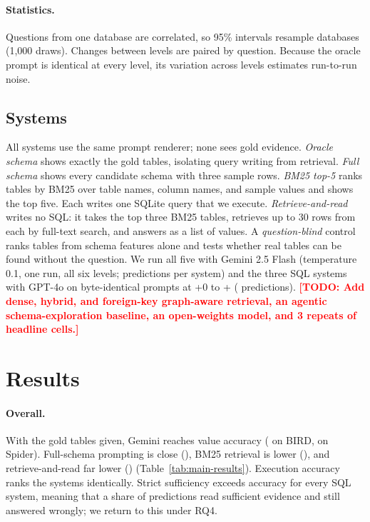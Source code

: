 \documentclass[11pt]{article}
\newif\ifdraft \drafttrue   %
\newcommand{\todo}[1]{\ifdraft\textcolor{red}{\textbf{[TODO: #1]}}\fi}
\begin{document}
\paragraph{Statistics.} Questions from one database are correlated, so 95\% intervals resample databases (1{,}000 draws). Changes between levels are paired by question. Because the oracle prompt is identical at every level, its variation across levels estimates run-to-run noise.

\subsection{Systems}\label{sec:systems}
All systems use the same prompt renderer; none sees gold evidence. \emph{Oracle schema} shows exactly the gold tables, isolating query writing from retrieval. \emph{Full schema} shows every candidate schema with three sample rows. \emph{BM25 top-5} ranks tables by BM25 over table names, column names, and sample values and shows the top five. Each writes one SQLite query that we execute. \emph{Retrieve-and-read} writes no SQL: it takes the top three BM25 tables, retrieves up to 30 rows from each by full-text search, and answers as a list of values. A \emph{question-blind} control ranks tables from schema features alone and tests whether real tables can be found without the question. We run all five with Gemini 2.5 Flash (temperature 0.1, one run, all six levels; \nPredictions{} predictions per system) and the three SQL systems with GPT-4o on byte-identical prompts at +0 to +\gpCommonTop{} (\gpNPredictions{} predictions). \todo{Add dense, hybrid, and foreign-key graph-aware retrieval, an agentic schema-exploration baseline, an open-weights model, and 3 repeats of headline cells.}

\section{Results}\label{sec:results}

\paragraph{Overall.} With the gold tables given, Gemini reaches value accuracy \orValue{} (\orBird{} on BIRD, \orSpider{} on Spider). Full-schema prompting is close (\fsValue{}), BM25 retrieval is lower (\bmValue{}), and retrieve-and-read far lower (\rrValue{}) (Table~\ref{tab:main-results}). Execution accuracy ranks the systems identically. Strict sufficiency exceeds accuracy for every SQL system, meaning that a share of predictions read sufficient evidence and still answered wrongly; we return to this under RQ4.
\end{document}
